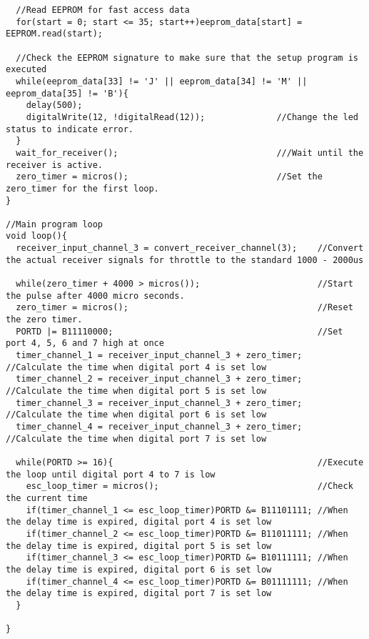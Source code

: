 \begin{lstlisting}
  //Read EEPROM for fast access data
  for(start = 0; start <= 35; start++)eeprom_data[start] = EEPROM.read(start);
  
  //Check the EEPROM signature to make sure that the setup program is executed
  while(eeprom_data[33] != 'J' || eeprom_data[34] != 'M' || eeprom_data[35] != 'B'){
    delay(500);
    digitalWrite(12, !digitalRead(12));              //Change the led status to indicate error.
  }
  wait_for_receiver();                               ///Wait until the receiver is active.
  zero_timer = micros();                             //Set the zero_timer for the first loop.
}

//Main program loop
void loop(){
  receiver_input_channel_3 = convert_receiver_channel(3);    //Convert the actual receiver signals for throttle to the standard 1000 - 2000us
    
  while(zero_timer + 4000 > micros());                       //Start the pulse after 4000 micro seconds.
  zero_timer = micros();                                     //Reset the zero timer.
  PORTD |= B11110000;                                        //Set port 4, 5, 6 and 7 high at once
  timer_channel_1 = receiver_input_channel_3 + zero_timer;   //Calculate the time when digital port 4 is set low
  timer_channel_2 = receiver_input_channel_3 + zero_timer;   //Calculate the time when digital port 5 is set low
  timer_channel_3 = receiver_input_channel_3 + zero_timer;   //Calculate the time when digital port 6 is set low
  timer_channel_4 = receiver_input_channel_3 + zero_timer;   //Calculate the time when digital port 7 is set low
  
  while(PORTD >= 16){                                        //Execute the loop until digital port 4 to 7 is low
    esc_loop_timer = micros();                               //Check the current time
    if(timer_channel_1 <= esc_loop_timer)PORTD &= B11101111; //When the delay time is expired, digital port 4 is set low
    if(timer_channel_2 <= esc_loop_timer)PORTD &= B11011111; //When the delay time is expired, digital port 5 is set low
    if(timer_channel_3 <= esc_loop_timer)PORTD &= B10111111; //When the delay time is expired, digital port 6 is set low
    if(timer_channel_4 <= esc_loop_timer)PORTD &= B01111111; //When the delay time is expired, digital port 7 is set low
  }
  
}


\end{lstlisting}
